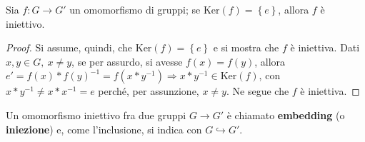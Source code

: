 \documentclass[11pt, a4paper]{scrartcl}
\theoremstyle{definition}
\numberwithin{esempio}{section}
\theoremstyle{definition}
\numberwithin{obs}{section}
\numberwithin{nota}{section}
\numberwithin{equation}{subsection}
\begin{document}
\begin{prop}
	{}{}
	Sia $f : G\to G'$ un omomorfismo di gruppi; se $\mathrm{Ker} (f) = \left\{ e \right\} $, allora $f$ \`e iniettivo.
	\begin{proof}
		Si assume, quindi, che $\mathrm{Ker} (f) = \left\{ e \right\} $ e si mostra che $f$ \`e iniettiva. Dati $x,y \in G, \ x\neq y$, se per assurdo, si avesse $f(x) = f(y)$, allora $ e'=  f(x) * f(y)^{-1} = f(x * y^{-1} )\Rightarrow x*y^{-1}  \in \mathrm{Ker} (f)$, con $x*y^{-1}  \neq x * x^{-1} = e$ perch\'e, per assunzione, $x \neq y$.
		Ne segue che $f$ \`e iniettiva.
	\end{proof}
\end{prop}
\noindent Un omomorfismo iniettivo fra due gruppi $G\to G'$ \`e chiamato \textbf{embedding} (o \textbf{iniezione}) e, come l'inclusione, si indica con $G \hookrightarrow G'$.
\end{document}
